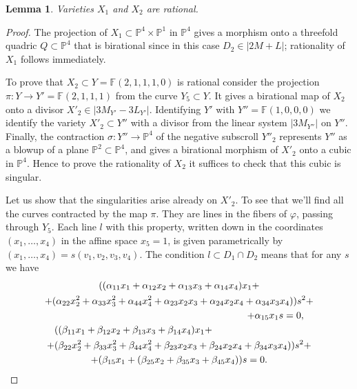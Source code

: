 \documentclass[12pt]{amsart}
\newtheorem{lemma}[equation]{Lemma}
\theoremstyle{definition}
\theoremstyle{remark}
\begin{document}
\begin{lemma}\label{lemma:rationality}
Varieties $X_1$ and $X_2$ are rational.
\end{lemma}
\begin{proof}
The projection of $X_1\subset{\mathbb{P}}^4\times{\mathbb{P}}^1$ in 
${\mathbb{P}}^4$ gives a morphism onto a threefold quadric 
$Q\subset{\mathbb{P}}^4$ that is birational since in this case $D_2\in |2M+L|$;
rationality of $X_1$ follows immediately. 

To prove that $X_2\subset Y={\mathbb{F}}(2, 1, 1, 1, 0)$ is rational consider
the projection $\pi:Y\to Y'={\mathbb{F}}(2, 1, 1, 1)$ from the curve 
$Y_5\subset Y$. It gives a birational map of $X_2$ onto a divisor 
$X'_2\in |3M_{Y'}-3L_{Y'}|$. Identifying $Y'$ with 
$Y''={\mathbb{F}}(1, 0, 0, 0)$ we identify the variety 
$X'_2\subset Y''$ with a divisor from the linear system $|3M_{Y''}|$ on $Y''$.
Finally, the contraction $\sigma:Y''\to{\mathbb{P}}^4$ of the negative subscroll
$Y''_2$ represents $Y''$ as a blowup of a plane  
${\mathbb{P}}^2\subset{\mathbb{P}}^4$, and gives a birational morphism of 
$X'_2$ onto a cubic in ${\mathbb{P}}^4$. Hence to prove the rationality 
of $X_2$ it suffices to check that this cubic is singular. 

Let us show that the singularities arise already on $X'_2$. To see that we'll
find all the curves contracted by the map $\pi$. They are lines
in the fibers of $\varphi$, passing through $Y_5$. Each line $l$ with this 
property, written down in the coordinates  
$(x_1, \ldots, x_4)$ in the affine space $x_5=1$, is given parametrically
by $(x_1, \ldots, x_4)=s(v_1, v_2, v_3, v_4)$. 
The condition $l\subset D_1\cap D_2$ means that for any $s$ we have
\begin{multline*}
((\alpha_{11}x_1+\alpha_{12}x_2+\alpha_{13}x_3+\alpha_{14}x_4)x_1+\\
+(\alpha_{22}x_2^2+\alpha_{33}x_3^2+\alpha_{44}x_4^2+
\alpha_{23}x_2x_3+\alpha_{24}x_2x_4+\alpha_{34}x_3x_4))s^2+\\
\shoveright{+\alpha_{15}x_1s=0,}\\
\shoveleft{((\beta_{11}x_1+\beta_{12}x_2+\beta_{13}x_3+\beta_{14}x_4)x_1+}\\
+(\beta_{22}x_2^2+\beta_{33}x_3^2+\beta_{44}x_4^2+
\beta_{23}x_2x_3+\beta_{24}x_2x_4+\beta_{34}x_3x_4))s^2+\\
+(\beta_{15}x_1+(\beta_{25}x_2+\beta_{35}x_3+\beta_{45}x_4))s=0.
\end{multline*}


\end{proof}
\end{document}
